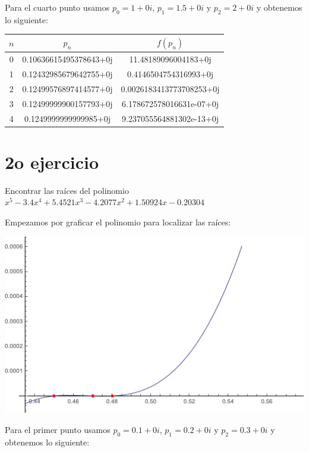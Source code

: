 \documentclass{article}
\begin{document}
Para el cuarto punto usamos $p_0 = 1 + 0i$, $p_1 = 1.5 + 0i$ y $p_2 = 2 + 0i$ y obtenemos lo siguiente:
\begin{center}
    \begin{tabular}{||c c c||} 
    \hline
    $n$ & $p_{n}$ & $f(p_n)$ \\ [0.5ex] 
    \hline
    0 & 0.10636615495378643+0j & 11.48189096004183+0j\\
    \hline
    1 & 0.12432985679642755+0j & 0.4146504754316993+0j \\
    \hline
    2 & 0.12499576897414577+0j & 0.0026183413773708253+0j \\
    \hline
    3 & 0.12499999900157793+0j& 6.178672578016631e-07+0j \\ 
    \hline
    4 & 0.1249999999999985+0j & 9.237055564881302e-13+0j \\ [1ex]
    \hline

   \end{tabular}
\end{center}


\section{2o ejercicio}
Encontrar las raíces del polinomio $x^5 -3.4x^4 + 5.4521x^3 -4.2077x^2 + 1.50924x - 0.20304$

Empezamos por graficar el polinomio para localizar las raíces:
\begin{center}
    \includegraphics[scale=0.5]{grafica2.png}    
\end{center}

Para el primer punto usamos $p_0 = 0.1 + 0i$, $p_1 = 0.2 + 0i$ y $p_2 = 0.3 + 0i$ y obtenemos lo siguiente:
\end{document}
